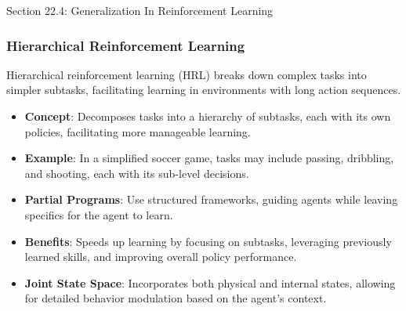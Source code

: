 \begin{notes}{Section 22.4: Generalization In Reinforcement Learning}
\begin{highlight}
    \end{highlight}
    
    \subsubsection*{Hierarchical Reinforcement Learning}
    
    Hierarchical reinforcement learning (HRL) breaks down complex tasks into simpler subtasks, facilitating learning in environments with long action sequences.
    
    \begin{highlight}
    
        \begin{itemize}
            \item \textbf{Concept}: Decomposes tasks into a hierarchy of subtasks, each with its own policies, facilitating more manageable learning.
            \item \textbf{Example}: In a simplified soccer game, tasks may include passing, dribbling, and shooting, each with its sub-level decisions.
            \item \textbf{Partial Programs}: Use structured frameworks, guiding agents while leaving specifics for the agent to learn.
            \item \textbf{Benefits}: Speeds up learning by focusing on subtasks, leveraging previously learned skills, and improving overall policy performance.
            \item \textbf{Joint State Space}: Incorporates both physical and internal states, allowing for detailed behavior modulation based on the agent's context.
        \end{itemize}
    
    \end{highlight}
    
    \begin{highlight}
    

\end{highlight}
\end{notes}
